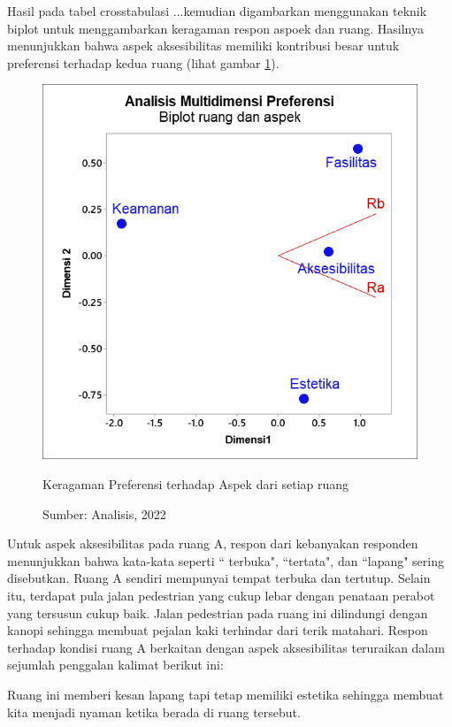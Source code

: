 \documentclass[11pt]{udthesis} %
\begin{document}
Hasil pada tabel crosstabulasi ...kemudian digambarkan menggunakan teknik biplot untuk menggambarkan keragaman respon aspoek dan ruang. Hasilnya menunjukkan bahwa aspek aksesibilitas memiliki kontribusi besar untuk preferensi terhadap kedua ruang (lihat gambar \ref{fig:bra}).

\begin{figure}[htpb]
    \centering
    \includegraphics[width=\textwidth,trim={.4cm .3cm .4cm .1cm},clip]{figures/bra.png}
    \caption{Keragaman Preferensi terhadap Aspek dari setiap ruang}
    \caption*{Sumber: Analisis, 2022}
    \label{fig:bra}
\end{figure}


Untuk aspek aksesibilitas pada ruang A, respon dari kebanyakan responden menunjukkan bahwa kata-kata seperti `` terbuka", ``tertata", dan ``lapang" sering disebutkan. Ruang A sendiri mempunyai tempat terbuka dan tertutup. Selain itu, terdapat pula jalan pedestrian yang cukup lebar dengan penataan perabot yang tersusun cukup baik. Jalan pedestrian pada ruang ini dilindungi dengan kanopi sehingga membuat pejalan kaki terhindar dari terik matahari. Respon terhadap kondisi ruang A berkaitan dengan aspek aksesibilitas teruraikan dalam sejumlah penggalan kalimat berikut ini:

\begin{quoting}
    Ruang ini memberi kesan lapang tapi tetap memiliki estetika sehingga membuat kita menjadi nyaman ketika berada di ruang tersebut.
\end{quoting}
\end{document}
